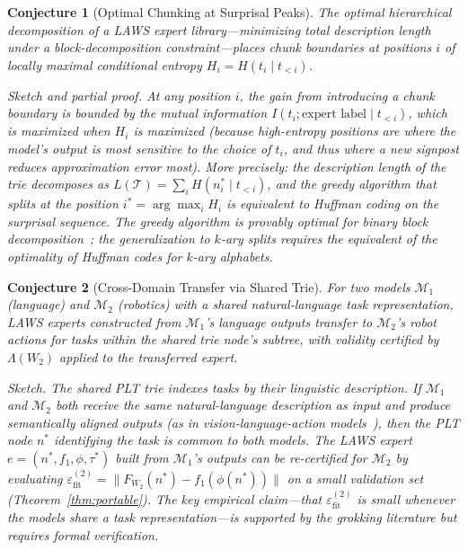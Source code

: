 \documentclass[11pt]{article}
\newtheorem{conjecture}{Conjecture}
\begin{document}
\begin{conjecture}[Optimal Chunking at Surprisal Peaks]
\label{conj:chunking}
The optimal hierarchical decomposition of a LAWS expert library---minimizing
total description length under a block-decomposition constraint---places chunk
boundaries at positions $i$ of locally maximal conditional entropy $H_i = H(t_i \mid t_{<i})$.

\emph{Sketch and partial proof.}
At any position $i$, the gain from introducing a chunk boundary is bounded by
the mutual information $I(t_i; \text{expert label} \mid t_{<i})$, which is
maximized when $H_i$ is maximized (because high-entropy positions are where the
model's output is most sensitive to the choice of $t_i$, and thus where a
new signpost reduces approximation error most).  More precisely: the description
length of the trie decomposes as
$L(\mathcal{T}) = \sum_i H(n^*_i \mid t_{<i})$,
and the greedy algorithm that splits at the position $i^* = \arg\max_i H_i$
is equivalent to Huffman coding on the surprisal sequence.  The greedy algorithm
is provably optimal for binary block decomposition~\cite{knuth1971}; the
generalization to $k$-ary splits requires the equivalent of the optimality of
Huffman codes for $k$-ary alphabets.
\end{conjecture}

\begin{conjecture}[Cross-Domain Transfer via Shared Trie]
\label{conj:crossdomain}
For two models $\mathcal{M}_1$ (language) and $\mathcal{M}_2$ (robotics) with
a shared natural-language task representation, LAWS experts constructed from
$\mathcal{M}_1$'s language outputs transfer to $\mathcal{M}_2$'s robot actions
for tasks within the shared trie node's subtree, with validity certified by
$\Lambda(W_2)$ applied to the transferred expert.

\emph{Sketch.}  The shared PLT trie indexes tasks by their linguistic description.
If $\mathcal{M}_1$ and $\mathcal{M}_2$ both receive the same natural-language
description as input and produce semantically aligned outputs (as in
vision-language-action models~\cite{brohan2023rt2,black2024pi0}), then the
PLT node $n^*$ identifying the task is common to both models.  The LAWS
expert $e = (n^*, f_1, \phi, \tau^*)$ built from $\mathcal{M}_1$'s outputs
can be re-certified for $\mathcal{M}_2$ by evaluating
$\varepsilon_{\mathrm{fit}}^{(2)} = \|F_{W_2}(n^*) - f_1(\phi(n^*))\|$
on a small validation set (Theorem~\ref{thm:portable}).  The key empirical
claim---that $\varepsilon_{\mathrm{fit}}^{(2)}$ is small whenever the models
share a task representation---is supported by the grokking literature but
requires formal verification.
\end{conjecture}
\end{document}
